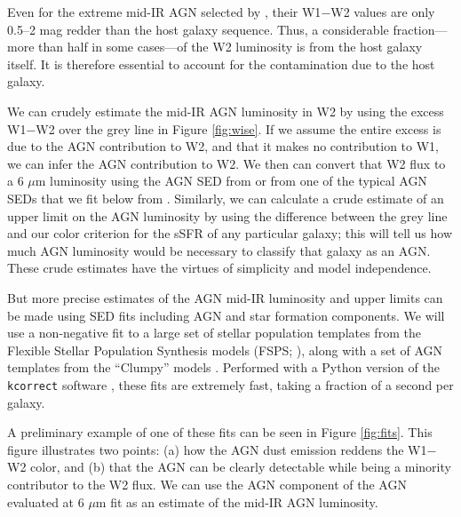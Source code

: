 \documentclass[12pt, preprint]{hacked-aastex}
\begin{document}
Even for the extreme mid-IR AGN selected by \cite{assef18a}, their
W1$-$W2 values are only 0.5--2 mag redder than the host galaxy
sequence. Thus, a considerable fraction---more than half in some
cases---of the W2 luminosity is from the host galaxy itself. It is
therefore essential to account for the contamination due to the host
galaxy.

We can crudely estimate the mid-IR AGN luminosity in W2 by using the
excess W1$-$W2 over the grey line in Figure \ref{fig:wise}.  If we
assume the entire excess is due to the AGN contribution to W2, and
that it makes no contribution to W1, we can infer the AGN contribution
to W2. We then can convert that W2 flux to a 6 $\mu$m luminosity using
the AGN SED from \cite{richards06a} or from one of the typical AGN
SEDs that we fit below from \cite{nenkova08a}.  Similarly, we can
calculate a crude estimate of an upper limit on the AGN luminosity by
using the difference between the grey line and our color criterion for
the sSFR of any particular galaxy; this will tell us how much AGN
luminosity would be necessary to classify that galaxy as an AGN.
These crude estimates have the virtues of simplicity and model
independence.

But more precise estimates of the AGN mid-IR luminosity and upper
limits can be made using SED fits including AGN and star formation
components. We will use a non-negative fit to a large set of stellar
population templates from the Flexible Stellar Population Synthesis
models (FSPS; \cite{conroy09a}), along with a set of AGN templates
from the ``Clumpy'' models \cite{nenkova08a}.  Performed with a Python
version of the {\tt kcorrect} software \cite{blanton07a}, these fits
are extremely fast, taking a fraction of a second per galaxy.

A preliminary example of one of these fits can be seen in Figure
\ref{fig:fits}. This figure illustrates two points: (a) how the AGN
dust emission reddens the W1$-$W2 color, and (b) that the AGN can be
clearly detectable while being a minority contributor to the W2
flux. We can use the AGN component of the AGN evaluated at 6 $\mu$m
fit as an estimate of the mid-IR AGN luminosity.
\end{document}
